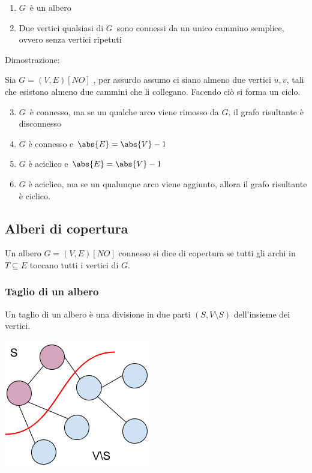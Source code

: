 \documentclass{article}
\providecommand{\tightlist}{%
  \setlength{\itemsep}{0pt}\setlength{\parskip}{0pt}}
\begin{document}
{{{\begin{enumerate}
\tightlist
\item
  $G${~è un albero}
\item
  {Due vertici qualsiasi di }$G${~sono
  connessi da un unico cammino semplice, ovvero senza vertici ripetuti}
\end{enumerate}

{Dimostrazione}{:~~~~~~~~}

{Sia }$G=(V,E) [NO]$ {, per assurdo assumo ci siano almeno due vertici $u,v$, tali che esistono almeno due cammini che li collegano. Facendo ciò si forma un ciclo.}

\begin{enumerate}
\setcounter{enumi}{2}
\tightlist
\item
  $G${~è connesso, ma se un qualche
  arco viene rimosso da }$G${, il
  grafo risultante è disconnesso}
\item
  {$G$ è connesso e $\abs{E}=\abs{V}-1$}
\item
  {$G$ è aciclico e $\abs{E}=\abs{V}-1$}
\item
  {$G$ è aciclico, ma se un qualunque arco viene aggiunto, allora il grafo risultante è ciclico.}
\end{enumerate}

{}

\hypertarget{h.9btor4ygb1hb}{\subsection{\texorpdfstring{{Alberi di
copertura}}{Alberi di copertura}}\label{h.9btor4ygb1hb}}

{Un albero $G=(V,E) [NO]$ connesso si dice di copertura se tutti gli archi in $T \subseteq E$ toccano tutti i vertici di $G$.}

\hypertarget{h.rdrr6bsx8ypo}{\subsubsection{\texorpdfstring{{Taglio di
un albero}}{Taglio di un albero}}\label{h.rdrr6bsx8ypo}}

{Un taglio di un albero è una divisione in due parti $(S,V\setminus S)$ dell'insieme dei vertici.}

{}

{\includegraphics{images/image527.png}}

}}}
\end{document}

